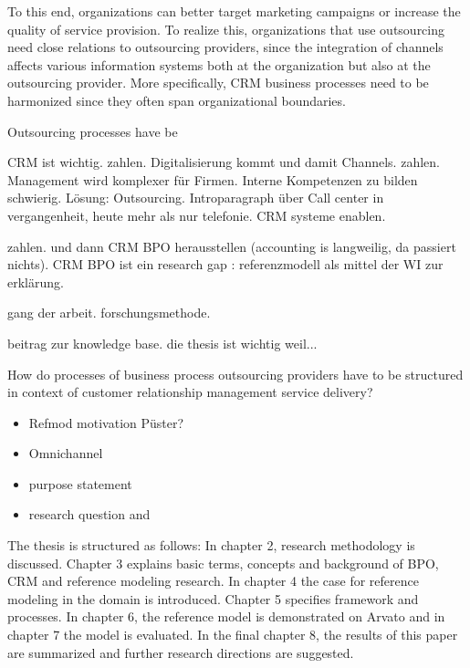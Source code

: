 To this end, organizations can better target marketing campaigns or increase the quality of service provision. To realize this, organizations that use outsourcing need close relations to outsourcing providers, since the integration of channels affects various information systems both at the organization but also at the outsourcing provider. More specifically, CRM business processes need to be harmonized since they often span organizational boundaries.


 

Outsourcing processes have be

CRM ist wichtig. zahlen. Digitalisierung kommt und damit Channels. zahlen. Management wird komplexer für Firmen. Interne Kompetenzen zu bilden schwierig. Lösung: Outsourcing. Introparagraph über Call center in vergangenheit, heute mehr als nur telefonie. CRM systeme enablen.

 zahlen. und dann CRM BPO herausstellen (accounting is langweilig, da passiert nichts). CRM BPO  ist ein research gap : referenzmodell als mittel der WI zur erklärung.

gang der arbeit.
forschungsmethode.

beitrag zur knowledge base. die thesis ist wichtig weil...


 How do processes of business process outsourcing providers have to be structured in context of customer relationship management service delivery? 

	\begin{itemize}
	
		\item Refmod motivation Püster?
		\item Omnichannel 
		\item purpose statement
		\item research question and 
	\end{itemize}



The thesis is structured as follows: In chapter 2, research methodology is discussed. Chapter 3 explains basic terms, concepts and background of BPO, CRM and reference modeling research. In chapter 4 the case for reference modeling in the domain is introduced. Chapter 5 specifies framework and processes. In chapter 6, the reference model is demonstrated on Arvato and in chapter 7 the model is evaluated. In the final chapter 8, the results of this paper are summarized and further research directions are suggested.
